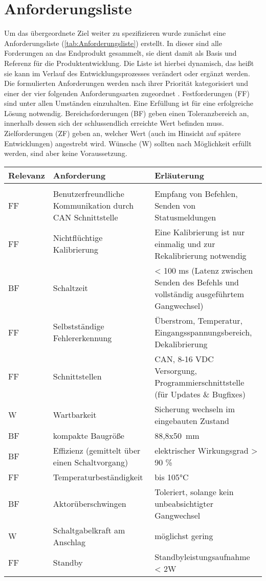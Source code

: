\section{Anforderungsliste}
Um das übergeordnete Ziel weiter zu spezifizieren wurde zunächst eine Anforderungsliste (\autoref{tab:Anforderungsliste}) erstellt. In dieser sind alle Forderungen an das Endprodukt gesammelt, sie dient damit als Basis und Referenz für die Produktentwicklung. Die Liste ist hierbei dynamisch, das heißt sie kann im Verlauf des Entwicklungsprozesses verändert oder ergänzt werden.  Die formulierten Anforderungen werden nach ihrer Priorität kategorisiert und einer der vier folgenden Anforderungsarten zugeordnet \cite[S.189]{2013a}. Festforderungen (FF) sind unter allen Umständen einzuhalten. Eine Erfüllung ist für eine erfolgreiche Lösung notwendig.
Bereichsforderungen (BF) geben einen Toleranzbereich an, innerhalb dessen sich der schlussendlich erreichte Wert befinden muss.
Zielforderungen (ZF) geben an, welcher Wert (auch im Hinsicht auf spätere Entwicklungen) angestrebt wird.
Wünsche (W) sollten nach Möglichkeit erfüllt werden, sind aber keine Voraussetzung. 

\begin{table}[h]
	\centering
		\begin{tabular}{l|p{7cm}|p{7cm}}
			\textbf{Relevanz} & \textbf{Anforderung} & \textbf{Erläuterung} \\ \hline
			& &\\
			FF & Benutzerfreundliche Kommunikation durch CAN Schnittstelle & Empfang von Befehlen, Senden von Statusmeldungen \\ \hline
			FF & Nichtflüchtige Kalibrierung & Eine Kalibrierung ist nur einmalig und zur Rekalibrierung notwendig \\ \hline
			BF & Schaltzeit & < 100 ms (Latenz zwischen Senden des Befehls und vollständig ausgeführtem Gangwechsel) \\ \hline
			FF & Selbstständige Fehlererkennung & Überstrom, Temperatur, Eingangsspannungsbereich, Dekalibrierung \\ \hline
			FF & Schnittstellen & CAN, 8-16 VDC Versorgung, Programmierschnittstelle (für Updates \& Bugfixes) \\ \hline
			W & Wartbarkeit & Sicherung wechseln im eingebauten Zustand \\ \hline
			BF & kompakte Baugröße & 88,8x\SI{50}{mm}\\ \hline
			BF & Effizienz (gemittelt über einen Schaltvorgang) & elektrischer Wirkungsgrad > 90 \% \\ \hline
			FF & Temperaturbeständigkeit & bis 105°C \\ \hline
			BF & Aktorüberschwingen & Toleriert, solange kein unbeabsichtigter Gangwechsel \\ \hline
			W & Schaltgabelkraft am Anschlag & möglichst gering \\ \hline
			FF & Standby & Standbyleistungsaufnahme < 2W \\ \hline
		\end{tabular}
	
	\label{tab:Anforderungsliste}
\end{table}

